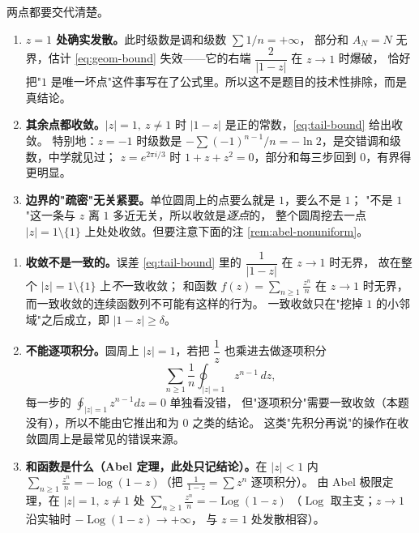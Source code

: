 \begin{remark}[原题为什么排除了 $z=1$，而且只排除它]\label{rem:why-z1}
两点都要交代清楚。
\begin{enumerate}[label=(\arabic*), leftmargin=2.2em]
\item \textbf{$z=1$ 处确实发散。}此时级数是调和级数 $\sum 1/n=+\infty$，
部分和 $A_N=N$ 无界，估计 \eqref{eq:geom-bound} 失效——它的右端 $\dfrac{2}{|1-z|}$ 在 $z\to1$ 时爆破，
恰好把"$1$ 是唯一坏点"这件事写在了公式里。所以这不是题目的技术性排除，而是真结论。
\item \textbf{其余点都收敛。}$|z|=1,\ z\ne1$ 时 $|1-z|$ 是正的常数，\eqref{eq:tail-bound} 给出收敛。
特别地：$z=-1$ 时级数是 $-\sum(-1)^{n-1}/n=-\ln2$，是交错调和级数，中学就见过；
$z=e^{2\pi i/3}$ 时 $1+z+z^2=0$，部分和每三步回到 $0$，有界得更明显。
\item \textbf{边界的"疏密"无关紧要。}单位圆周上的点要么就是 $1$，要么不是 $1$；
"不是 $1$"这一条与 $z$ 离 $1$ 多近无关，所以收敛是\emph{逐点}的，
整个圆周挖去一点 $|z|=1\setminus\{1\}$ 上处处收敛。但要注意下面的注 \ref{rem:abel-nonuniform}。
\end{enumerate}
\end{remark}

\begin{remark}[两个容易踩的坑]\label{rem:abel-nonuniform}
\begin{enumerate}[label=(\arabic*), leftmargin=2.2em]
\item \textbf{收敛不是一致的。}误差 \eqref{eq:tail-bound} 里的 $\dfrac{1}{|1-z|}$ 在 $z\to1$ 时无界，
故在整个 $|z|=1\setminus\{1\}$ 上\emph{不}一致收敛；
和函数 $f(z)=\sum_{n\ge1}\frac{z^n}{n}$ 在 $z\to1$ 时无界，
而一致收敛的连续函数列不可能有这样的行为。
一致收敛只在"挖掉 $1$ 的小邻域"之后成立，即 $|1-z|\ge\delta$。
\item \textbf{不能逐项积分。}圆周上 $|z|=1$，若把 $\dfrac1z$ 也乘进去做逐项积分
\[
\sum_{n\ge1}\frac1n\oint_{|z|=1}z^{n-1}\,dz ,
\]
每一步的 $\oint_{|z|=1}z^{n-1}dz=0$ 单独看没错，
但"逐项积分"需要一致收敛（本题没有），所以不能由它推出和为 $0$ 之类的结论。
这类"先积分再说"的操作在收敛圆周上是最常见的错误来源。
\item \textbf{和函数是什么（Abel 定理，此处只记结论）。}在 $|z|<1$ 内
$\sum_{n\ge1}\frac{z^n}{n}=-\log(1-z)$（把 $\frac{1}{1-z}=\sum z^n$ 逐项积分）。
由 Abel 极限定理，在 $|z|=1,\ z\ne1$ 处 $\sum_{n\ge1}\frac{z^n}{n}=-\operatorname{Log}(1-z)$
（$\operatorname{Log}$ 取主支；$z\to1$ 沿实轴时 $-\operatorname{Log}(1-z)\to+\infty$，
与 $z=1$ 处发散相容）。
\end{enumerate}
\end{remark}

